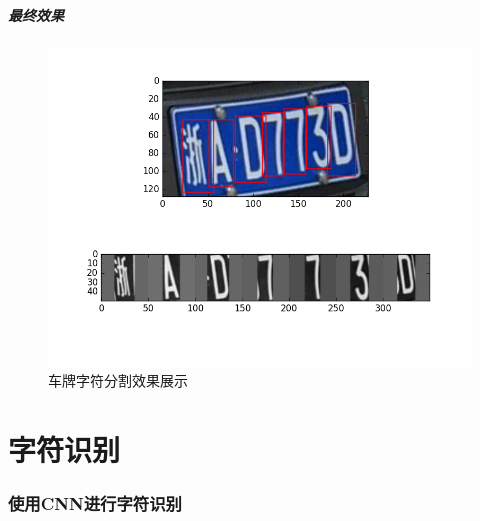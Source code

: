\documentclass[UTF8]{beamer}
\begin{document}
\begin{frame}
  \frametitle{最终效果}
  
  \begin{figure}[th]
    \centering
    \includegraphics[height=0.6\textheight, keepaspectratio]{./Figure/SegmentationDemo.png}
    \caption{车牌字符分割效果展示}\label{Fig:SegmentationDemo}
  \end{figure}
\end{frame}

\part{字符识别}

\section{使用CNN进行字符识别}
\end{document}
